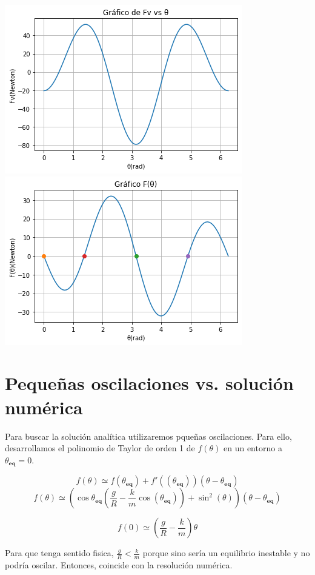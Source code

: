 \documentclass{article}
\begin{document}
	\includegraphics[scale=0.5]{01.png}
	\includegraphics[scale=0.5]{02.png}

	\section{Pequeñas oscilaciones vs. soluci\'on num\'erica}
	
	Para buscar la soluci\'on anal\'itica utilizaremos pqueñas oscilaciones. Para ello, desarrollamos el polinomio de Taylor de orden 1 de $f(\theta)$ en un entorno a $\theta_{\textbf{eq}} = 0$.
	
	$$
		f(\theta) \simeq f(\theta_{\textbf{eq}}) + f'((\theta_{\textbf{eq}}))(\theta - \theta_{\textbf{eq}})
	$$
	\begin{equation}
	\label{eqn:taylor}
		f(\theta) \simeq (\cos{\theta_{\textbf{eq}}}(\frac{g}{R} - \frac{k}{m}\cos(\theta_{\textbf{eq}})) + \sin^2{(\theta)})(\theta - \theta_{\textbf{eq}})
	\end{equation}
	
	$$f(0) \simeq (\frac{g}{R} - \frac{k}{m})\theta$$
	
	Para que tenga sentido fisica, $\frac{g}{R} < \frac{k}{m}$ porque sino ser\'ia un equilibrio inestable y no podr\'ia oscilar. Entonces, coincide con la resoluci\'on num\'erica.
	
\end{document}
